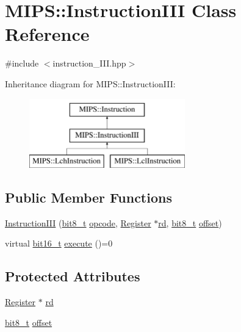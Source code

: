 \hypertarget{classMIPS_1_1InstructionIII}{}\section{M\+I\+PS\+:\+:Instruction\+I\+II Class Reference}
\label{classMIPS_1_1InstructionIII}


{\ttfamily \#include $<$instruction\+\_\+\+I\+I\+I.\+hpp$>$}

Inheritance diagram for M\+I\+PS\+:\+:Instruction\+I\+II\+:\begin{figure}[H]
\begin{center}
\leavevmode
\includegraphics[height=3.000000cm]{classMIPS_1_1InstructionIII}
\end{center}
\end{figure}
\subsection*{Public Member Functions}
\begin{DoxyCompactItemize}
\item 
\hyperlink{classMIPS_1_1InstructionIII_a0b3a67569e09bd53866536d5241a3d17}{Instruction\+I\+II} (\hyperlink{core_8hpp_a6074bae122ae7b527864eec42c728c3c}{bit8\+\_\+t} \hyperlink{classMIPS_1_1Instruction_a45cc6808b5dde8a5d41067d148b55476}{opcode}, \hyperlink{classMIPS_1_1Register}{Register} $\ast$\hyperlink{classMIPS_1_1InstructionIII_a76e7b218fc57cd2fc559bf72498090b6}{rd}, \hyperlink{core_8hpp_a6074bae122ae7b527864eec42c728c3c}{bit8\+\_\+t} \hyperlink{classMIPS_1_1InstructionIII_ad0ebd3b6e7594fc583e9a409bf99a6c7}{offset})
\item 
virtual \hyperlink{core_8hpp_adc265a970bc35995b5879784bbb3f1b7}{bit16\+\_\+t} \hyperlink{classMIPS_1_1InstructionIII_aee3071c23abc542e55b446abee766c5e}{execute} ()=0
\end{DoxyCompactItemize}
\subsection*{Protected Attributes}
\begin{DoxyCompactItemize}
\item 
\hyperlink{classMIPS_1_1Register}{Register} $\ast$ \hyperlink{classMIPS_1_1InstructionIII_a76e7b218fc57cd2fc559bf72498090b6}{rd}
\item 
\hyperlink{core_8hpp_a6074bae122ae7b527864eec42c728c3c}{bit8\+\_\+t} \hyperlink{classMIPS_1_1InstructionIII_ad0ebd3b6e7594fc583e9a409bf99a6c7}{offset}
\end{DoxyCompactItemize}



